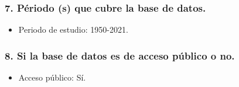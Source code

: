 \documentclass[
]{article}
\providecommand{\tightlist}{%
  \setlength{\itemsep}{0pt}\setlength{\parskip}{0pt}}
\begin{document}
\hypertarget{puxe9riodo-s-que-cubre-la-base-de-datos.}{%
\subsubsection{\texorpdfstring{\textbf{7.} Périodo (s) que cubre la base
de
datos.}{7. Périodo (s) que cubre la base de datos.}}\label{puxe9riodo-s-que-cubre-la-base-de-datos.}}

\begin{itemize}
\tightlist
\item
  Periodo de estudio: 1950-2021.
\end{itemize}

\hypertarget{si-la-base-de-datos-es-de-acceso-puxfablico-o-no.}{%
\subsubsection{\texorpdfstring{\textbf{8.} Si la base de datos es de
acceso público o
no.}{8. Si la base de datos es de acceso público o no.}}\label{si-la-base-de-datos-es-de-acceso-puxfablico-o-no.}}

\begin{itemize}
\tightlist
\item
  Acceso público: Sí.
\end{itemize}
\end{document}
